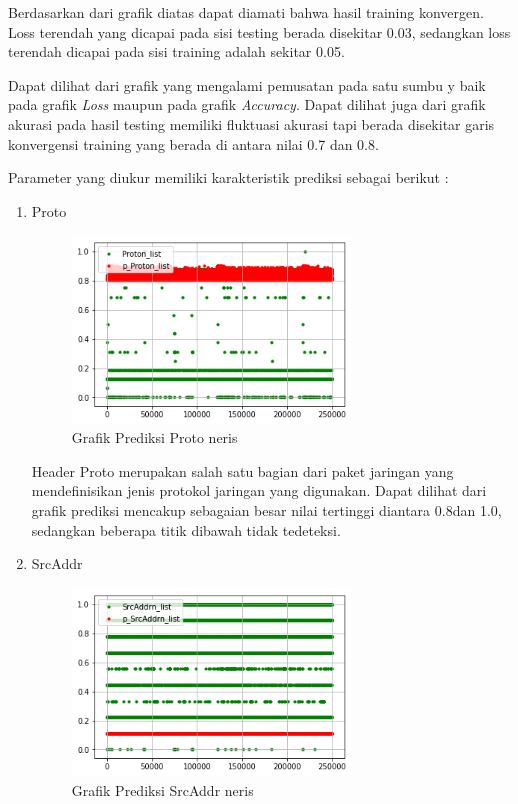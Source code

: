 \documentclass[./skripsi.tex]{subfiles}
\begin{document}
\par Berdasarkan dari grafik diatas dapat diamati bahwa hasil training konvergen. Loss terendah yang dicapai pada sisi testing berada disekitar 0.03, sedangkan loss terendah dicapai pada sisi training adalah sekitar 0.05. 
\par Dapat dilihat dari grafik yang mengalami pemusatan pada satu sumbu y baik pada grafik \textit{Loss} maupun pada grafik \textit{Accuracy}. Dapat dilihat juga dari grafik akurasi pada hasil testing memiliki fluktuasi akurasi tapi berada disekitar garis konvergensi training yang berada di antara nilai 0.7 dan 0.8.

\par Parameter yang diukur memiliki karakteristik prediksi sebagai berikut :
\begin{enumerate}
    \item Proto
    \begin{figure}%
        \centering
        \includegraphics[width=0.7\textwidth]{public/assets/img/lstmm_neris_pred1.png}
        \caption{Grafik Prediksi Proto neris}
        \label{fig:lstmm_neris_pred1}
    \end{figure}
    
    \par Header Proto merupakan salah satu bagian dari paket jaringan yang mendefinisikan jenis protokol jaringan yang digunakan. Dapat dilihat dari grafik prediksi mencakup sebagaian besar nilai tertinggi diantara 0.8dan 1.0, sedangkan beberapa titik dibawah tidak tedeteksi.
    
    \item SrcAddr
    \begin{figure}%
        \centering
        \includegraphics[width=0.7\textwidth]{public/assets/img/lstmm_neris_pred2.png}
        \caption{Grafik Prediksi SrcAddr neris}
        \label{fig:lstmm_neris_pred2}
    \end{figure}
    

\end{enumerate}
\end{document}
